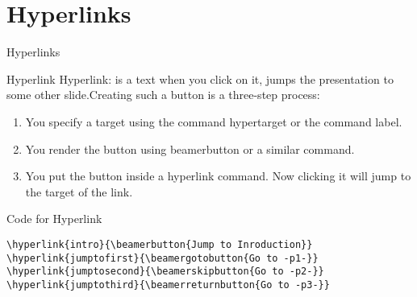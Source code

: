 \documentclass[10pt,xcolor=x11names]{beamer}
\begin{document}
\section{Hyperlinks}
\begin{frame}[fragile]{Hyperlinks} \vspace{-10pt} \label{hyper1}

{\footnotesize 
\begin{exampleblock}{Hyperlink}
Hyperlink: is a text when you click on it, jumps the presentation to some other slide.Creating such a button is a three-step process:
\begin{enumerate}
    \item You specify a target using the command \alert{hypertarget} or the command \alert{label}.
    \item You render the button using \alert{beamerbutton} or a similar command.
    \item You put the button inside a \alert{hyperlink} command. Now clicking it will jump to the target of the link.
\end{enumerate} 
\end{exampleblock}

\begin{exampleblock}{ Code for Hyperlink}
	\begin{verbatim}	
\hyperlink{intro}{\beamerbutton{Jump to Inroduction}}
\hyperlink{jumptofirst}{\beamergotobutton{Go to -p1-}}
\hyperlink{jumptosecond}{\beamerskipbutton{Go to -p2-}}
\hyperlink{jumptothird}{\beamerreturnbutton{Go to -p3-}}
	\end{verbatim}
\end{exampleblock}

}

\hyperlink{intro}{}
\hyperlink{jumptofirst}{}
\hyperlink{jumptosecond}{}
\hyperlink{jumptothird}{}

\end{frame}
\end{document}
